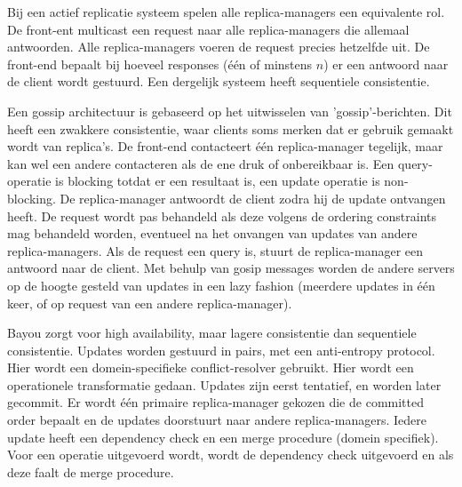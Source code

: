 \documentclass[../samenvatting.tex]{subfiles}
\begin{document}
Bij een actief replicatie systeem spelen alle replica-managers een equivalente rol. De front-ent multicast een request naar alle replica-managers die allemaal antwoorden. Alle replica-managers voeren de request precies hetzelfde uit. De front-end bepaalt bij hoeveel responses (één of minstens $n$) er een antwoord naar de client wordt gestuurd. Een dergelijk systeem heeft sequentiele consistentie.

Een gossip architectuur is gebaseerd op het uitwisselen van 'gossip'-berichten. Dit heeft een zwakkere consistentie, waar clients soms merken dat er gebruik gemaakt wordt van replica's. De front-end contacteert één replica-manager tegelijk, maar kan wel een andere contacteren als de ene druk of onbereikbaar is. Een query-operatie is blocking totdat er een resultaat is, een update operatie is non-blocking. De replica-manager antwoordt de client zodra hij de update ontvangen heeft. De request wordt pas behandeld als deze volgens de ordering constraints mag behandeld worden, eventueel na het onvangen van updates van andere replica-managers. Als de request een query is, stuurt de replica-manager een antwoord naar de client. Met behulp van gosip messages worden de andere servers op de hoogte gesteld van updates in een lazy fashion (meerdere updates in één keer, of op request van een andere replica-manager).

Bayou zorgt voor high availability, maar lagere consistentie dan sequentiele consistentie. Updates worden gestuurd in pairs, met een anti-entropy protocol. Hier wordt een domein-specifieke conflict-resolver gebruikt. Hier wordt een operationele transformatie gedaan. Updates zijn eerst tentatief, en worden later gecommit. Er wordt één primaire replica-manager gekozen die de committed order bepaalt en de updates doorstuurt naar andere replica-managers. Iedere update heeft een dependency check en een merge procedure (domein specifiek). Voor een operatie uitgevoerd wordt, wordt de dependency check uitgevoerd en als deze faalt de merge procedure. 
\end{document}
